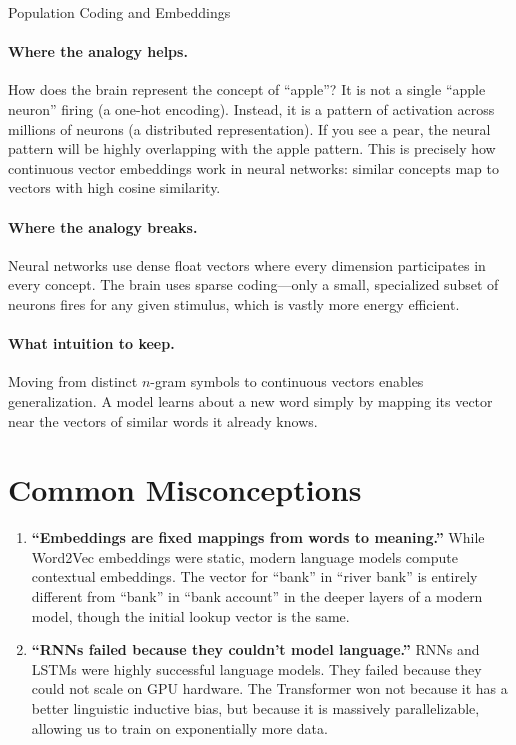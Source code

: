 \begin{analogybox}{Population Coding and Embeddings}
  \paragraph{Where the analogy helps.}
  How does the brain represent the concept of ``apple''? It is not a single ``apple neuron'' firing (a one-hot encoding). Instead, it is a pattern of activation across millions of neurons (a distributed representation). If you see a pear, the neural pattern will be highly overlapping with the apple pattern. This is precisely how continuous vector embeddings work in neural networks: similar concepts map to vectors with high cosine similarity.

  \paragraph{Where the analogy breaks.}
  Neural networks use dense float vectors where every dimension participates in every concept. The brain uses sparse coding---only a small, specialized subset of neurons fires for any given stimulus, which is vastly more energy efficient.

  \paragraph{What intuition to keep.}
  Moving from distinct $n$-gram symbols to continuous vectors enables generalization. A model learns about a new word simply by mapping its vector near the vectors of similar words it already knows.
\end{analogybox}


\section{Common Misconceptions}
\label{ch:08:sec:misconceptions}

\begin{enumerate}
  \item \textbf{``Embeddings are fixed mappings from words to meaning.''} While Word2Vec embeddings were static, modern language models compute contextual embeddings. The vector for ``bank'' in ``river bank'' is entirely different from ``bank'' in ``bank account'' in the deeper layers of a modern model, though the initial lookup vector is the same.
  \item \textbf{``RNNs failed because they couldn't model language.''} RNNs and LSTMs were highly successful language models. They failed because they could not scale on GPU hardware. The Transformer won not because it has a better linguistic inductive bias, but because it is massively parallelizable, allowing us to train on exponentially more data.
\end{enumerate}


